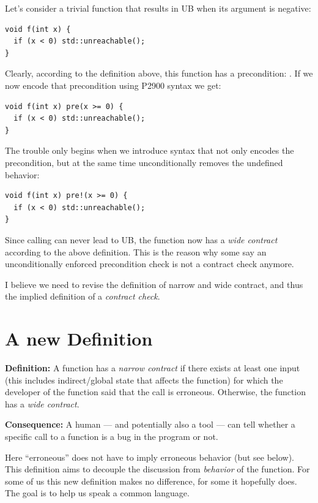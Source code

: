 Let's consider a trivial function  that results in UB when its argument is negative:
\medskip\begin{lstlisting}
void f(int x) {
  if (x < 0) std::unreachable();
}
\end{lstlisting}
Clearly, according to the definition above, this function has a precondition: .
If we now encode that precondition using P2900 syntax we get:
\medskip\begin{lstlisting}[style=Vc]
void f(int x) pre(x >= 0) {
  if (x < 0) std::unreachable();
}
\end{lstlisting}
The trouble only begins when we introduce syntax that not only encodes the precondition, but at the
same time unconditionally removes the undefined behavior:
\medskip\begin{lstlisting}[style=Vc]
void f(int x) pre!(x >= 0) {
  if (x < 0) std::unreachable();
}
\end{lstlisting}
Since calling  can never lead to UB, the function now has a \emph{wide contract} according
to the above definition.
This is the reason why some say an unconditionally enforced precondition check is not a contract
check anymore.

I believe we need to revise the definition of narrow and wide contract, and thus the implied
definition of a \emph{contract check}.

\section{A new Definition}

\textbf{Definition:}
A function has a \emph{narrow contract} if there exists at least one input (this includes
indirect/global state that affects the function) for which the developer of the function said that
the call is erroneous.
Otherwise, the function has a \emph{wide contract}.

\bigskip

\noindent\textbf{Consequence:}
A human — and potentially also a tool — can tell whether a specific call to a function is a bug in
the program or not.

\bigskip

Here “erroneous” does not have to imply erroneous behavior (but see below).
This definition aims to decouple the discussion from \emph{behavior} of the function.
For some of us this new definition makes no difference, for some it hopefully does.
The goal is to help us speak a common language.

